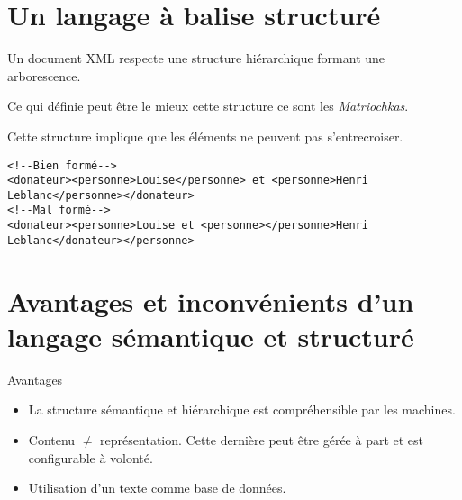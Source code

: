 \documentclass[18pt,a4paper,oneside]{book} %
\begin{document}
\section{Un langage à balise structuré}

Un document XML respecte une structure hiérarchique formant une arborescence.


Ce qui définie peut être le mieux cette structure ce sont les \textit{Matriochkas}.

\begin{center}
\begin{figure}[H]
\end{figure}
\end{center}
\bigskip 

Cette structure implique que les éléments ne peuvent pas s'entrecroiser.

\lstset{language=XML}
\begin{lstlisting}
<!--Bien formé-->
<donateur><personne>Louise</personne> et <personne>Henri Leblanc</personne></donateur>
<!--Mal formé-->
<donateur><personne>Louise et <personne></personne>Henri Leblanc</donateur></personne>
\end{lstlisting}

\section{Avantages et inconvénients d'un langage sémantique et structuré}


 Avantages
\bigskip 
\begin{itemize}
\item La structure sémantique et hiérarchique est compréhensible par les machines.

\item Contenu $\neq$ représentation. Cette dernière peut être gérée à part et est configurable à volonté.

\item Utilisation d'un texte comme base de données. 
\end{itemize}
\bigskip 
\end{document}
